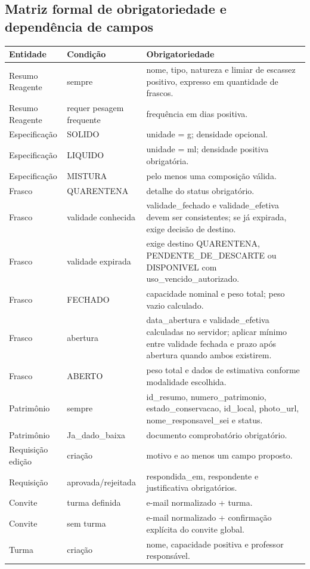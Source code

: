 \documentclass[12pt,a4paper]{article}
\begin{document}
\subsection{Matriz formal de obrigatoriedade e dependência de campos}
\begin{center}
\small
\begin{tabularx}{0.96\textwidth}{>{\raggedright\arraybackslash}p{} >{\raggedright\arraybackslash}p{} >{\raggedright\arraybackslash}X}
\toprule
\textbf{Entidade} & \textbf{Condição} & \textbf{Obrigatoriedade}\\
\midrule
Resumo Reagente & sempre & nome, tipo, natureza e limiar de escassez positivo, expresso em quantidade de frascos.\\
Resumo Reagente & requer pesagem frequente & frequência em dias positiva.\\
Especificação & SOLIDO & unidade = g; densidade opcional.\\
Especificação & LIQUIDO & unidade = ml; densidade positiva obrigatória.\\
Especificação & MISTURA & pelo menos uma composição válida.\\
Frasco & QUARENTENA & detalhe do status obrigatório.\\
Frasco & validade conhecida & validade\_fechado e validade\_efetiva devem ser consistentes; se já expirada, exige decisão de destino.\\
Frasco & validade expirada & exige destino QUARENTENA, PENDENTE\_DE\_DESCARTE ou DISPONIVEL com uso\_vencido\_autorizado.\\
Frasco & FECHADO & capacidade nominal e peso total; peso vazio calculado.\\
Frasco & abertura & data\_abertura e validade\_efetiva calculadas no servidor; aplicar mínimo entre validade fechada e prazo após abertura quando ambos existirem.\\
Frasco & ABERTO & peso total e dados de estimativa conforme modalidade escolhida.\\
Patrimônio & sempre & id\_resumo, numero\_patrimonio, estado\_conservacao, id\_local, photo\_url, nome\_responsavel\_sei e status.\\
Patrimônio & Ja\_dado\_baixa & documento comprobatório obrigatório.\\
Requisição edição & criação & motivo e ao menos um campo proposto.\\
Requisição & aprovada/rejeitada & respondida\_em, respondente e justificativa obrigatórios.\\
Convite & turma definida & e-mail normalizado + turma.\\
Convite & sem turma & e-mail normalizado + confirmação explícita do convite global.\\
Turma & criação & nome, capacidade positiva e professor responsável.\\
\bottomrule
\end{tabularx}
\end{center}
\end{document}
